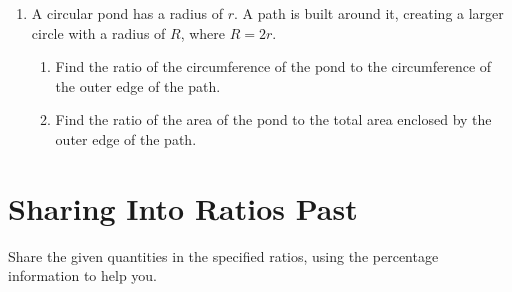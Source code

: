 \documentclass[12pt,a4paper]{article}
\begin{document}
\begin{enumerate}
\vspace{0.5cm}
\begin{center}
\end{center}
\textit{(Dimensions: Large rectangle is 8m by 6m. The unshaded rectangle has a length of 4m and is positioned centrally.)}

\vspace{1.2cm}

\item A circular pond has a radius of \( r \). A path is built around it, creating a larger circle with a radius of \( R \), where \( R = 2r \).
    \begin{enumerate}
    \item Find the ratio of the circumference of the pond to the circumference of the outer edge of the path.
    \item Find the ratio of the area of the pond to the total area enclosed by the outer edge of the path.
    \end{enumerate}

\vspace{1.2cm}
\end{enumerate}

\section*{Sharing Into Ratios Past}
Share the given quantities in the specified ratios, using the percentage information to help you.
\end{document}
